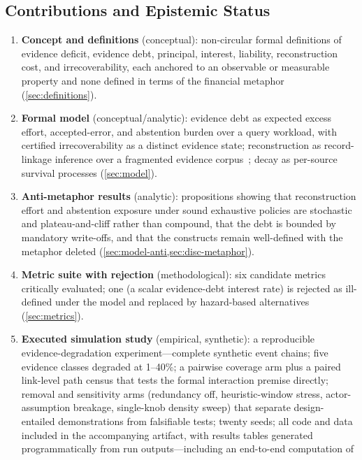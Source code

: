 \subsection{Contributions and Epistemic Status}
\label{sec:contributions}

\begin{enumerate}[label=\textbf{C\arabic*.},leftmargin=2.2em,itemsep=1.5pt,topsep=2pt]
\item \textbf{Concept and definitions} (conceptual): non-circular formal definitions
of evidence deficit, evidence debt, principal, interest, liability, reconstruction
cost, and irrecoverability, each anchored to an observable or measurable property and
none defined in terms of the financial metaphor (\cref{sec:definitions}).
\item \textbf{Formal model} (conceptual/analytic): evidence debt as expected excess
effort, accepted-error, and abstention burden over a query workload, with certified
irrecoverability as a distinct evidence state; reconstruction as record-linkage
inference over a fragmented evidence corpus~\cite{fellegi1969,christen2012}; decay
as per-source survival processes (\cref{sec:model}).
\item \textbf{Anti-metaphor results} (analytic): propositions showing that
reconstruction effort and abstention exposure under sound exhaustive policies are stochastic and plateau-and-cliff
rather than compound, that
the debt is bounded by mandatory write-offs, and that the constructs remain
well-defined with the metaphor deleted (\cref{sec:model-anti,sec:disc-metaphor}).
\item \textbf{Metric suite with rejection} (methodological): six candidate metrics
critically evaluated; one (a scalar evidence-debt interest rate) is rejected as
ill-defined under the model and replaced by hazard-based alternatives
(\cref{sec:metrics}).
\item \textbf{Executed simulation study} (empirical, synthetic): a reproducible
evidence-degradation experiment---complete synthetic event chains; five evidence
classes degraded at 1--40\%; a pairwise coverage arm plus a paired link-level path
census that tests the formal interaction premise directly; removal and sensitivity arms
(redundancy off, heuristic-window stress, actor-assumption breakage, single-knob
density sweep) that separate design-entailed demonstrations from falsifiable
tests; twenty seeds; all code and data included in the accompanying artifact, with results tables generated
programmatically from run outputs---including an end-to-end computation of

\end{enumerate}
